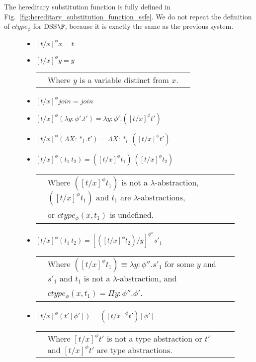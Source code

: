 The hereditary substitution function is fully defined in
Fig.~\ref{fig:hereditary_substitution_function_ssfe}.  We do not
repeat the definition of $ctype_\phi$ for DSS$\F$, because it is
exactly the same as the previous system. 
\begin{figure}[t]
  \small
  \begin{itemize}
  \item[] $[t/x]^\phi x = t$

  \item[] $[t/x]^\phi y = y$\\
    \begin{tabular}{lll}
      & Where $y$ is a variable distinct from $x$.\\
    \end{tabular}

  \item[] $[t/x]^\phi join = join$

  \item[] $[t/x]^\phi (\lambda y:\phi'.t') = \lambda y:\phi'.([t/x]^\phi t')$

  \item[] $[t/x]^\phi (\Lambda X:*_l.t') = \Lambda X:*_l.([t/x]^\phi t')$

  \item[] $[t/x]^\phi (t_1\ t_2) = ([t/x]^\phi t_1)\ ([t/x]^\phi t_2)$\\
    \begin{tabular}{lll}
      & Where $([t/x]^\phi t_1)$ is not a $\lambda$-abstraction, 
      $([t/x]^\phi t_1)$ and $t_1$ are $\lambda$-abstractions,\\ 
      & or $ctype_\phi(x,t_1)$ is undefined.
    \end{tabular}

  \item[] $[t/x]^{\phi} (t_1\ t_2) = [([t/x]^{\phi} t_2)/y]^{\phi''} s'_1$\\
    \begin{tabular}{lll}
      & Where $([t/x]^{\phi} t_1) \equiv \lambda y:\phi''.s'_1$ 
        for some $y$ and $s'_1$ and $t_1$ is not a $\lambda$-abstraction, and \\
      & $ctype_\phi(x,t_1) = \Pi y:\phi''.\phi'$.\\
    \end{tabular}

  \item[] $[t/x]^\phi (t'[\phi']) = ([t/x]^\phi t')[\phi']$\\
    \begin{tabular}{lll}
      & Where $[t/x]^\phi t'$ is not a type abstraction or
      $t'$ and $[t/x]^\phi t'$ are type abstractions.
    \end{tabular}


\end{itemize}
\end{figure}
